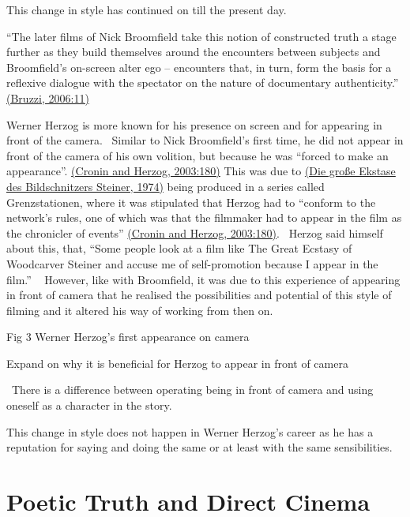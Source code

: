 \documentclass[
]{book}
\begin{document}
This change in style has continued on till the present day.

``The later films of Nick Broomfield take this notion of constructed truth a stage further as they build themselves around the encounters between subjects and Broomfield's on-screen alter ego -- encounters that, in turn, form the basis for a reflexive dialogue with the spectator on the nature of documentary authenticity.'' \href{https://paperpile.com/c/SdLVV0/oHFX/?locator=11}{(Bruzzi, 2006:11)}

Werner Herzog is more known for his presence on screen and for appearing in front of the camera.~ Similar to Nick Broomfield's first time, he did not appear in front of the camera of his own volition, but because he was ``forced to make an appearance''. \href{https://paperpile.com/c/SdLVV0/n5mQ/?locator=180}{(Cronin and Herzog, 2003:180)} This was due to \href{https://paperpile.com/c/SdLVV0/KRAK}{(Die große Ekstase des Bildschnitzers Steiner, 1974)} being produced in a series called Grenzstationen, where it was stipulated that Herzog had to ``conform to the network's rules, one of which was that the filmmaker had to appear in the film as the chronicler of events'' \href{https://paperpile.com/c/SdLVV0/n5mQ/?locator=180}{(Cronin and Herzog, 2003:180)}.~ Herzog said himself about this, that, ``Some people look at a film like The Great Ecstasy of Woodcarver Steiner and accuse me of self-promotion because I appear in the film.'' ~ However, like with Broomfield, it was due to this experience of appearing in front of camera that he realised the possibilities and potential of this style of filming and it altered his way of working from then on.

Fig 3 Werner Herzog's first appearance on camera

Expand on why it is beneficial for Herzog to appear in front of camera

~There is a difference between operating being in front of camera and using oneself as a character in the story.~

This change in style does not happen in Werner Herzog's career as he has a reputation for saying and doing the same or at least with the same sensibilities.

\hypertarget{poetic-truth-and-direct-cinema}{%
\section{Poetic Truth and Direct Cinema}\label{poetic-truth-and-direct-cinema}}
\end{document}
